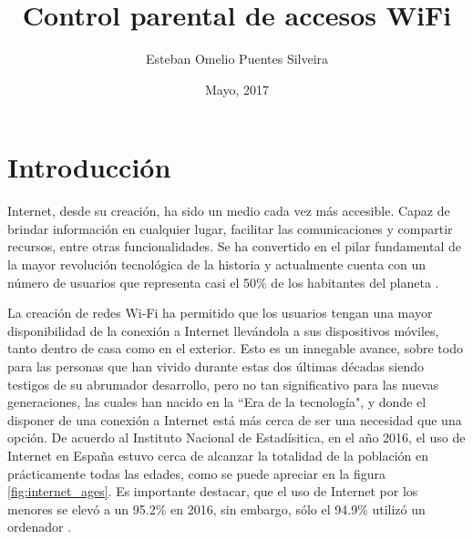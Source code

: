 \documentclass[12pt, twoside]{article}
\title{Control parental de accesos WiFi}
\author{Esteban Omelio Puentes Silveira}
\date{Mayo, 2017}
\begin{document}

\renewcommand\contentsname{Índice}
\renewcommand\listfigurename{Índice de figuras}
\renewcommand\listtablename{Índice de tablas}

\setlength{\parskip}{1em}

\tableofcontents
\clearpage
\listoffigures
\clearpage
\listoftables
\clearpage

\cleardoublepage \section{Introducción}\label{sec:int}


Internet, desde su creación, ha sido un medio cada vez más accesible. Capaz de brindar información en cualquier lugar, facilitar las comunicaciones y compartir recursos, entre otras funcionalidades. Se ha convertido en el pilar fundamental de la mayor revolución tecnológica de la historia y actualmente cuenta con un número de usuarios que representa casi el 50\% de los habitantes del planeta \cite{InternetUsage}.

La creación de redes Wi-Fi ha permitido que los usuarios tengan una mayor disponibilidad de la conexión a Internet llevándola a sus dispositivos móviles, tanto dentro de casa como en el exterior. Esto es un innegable avance, sobre todo para las personas que han vivido durante estas dos últimas décadas siendo testigos de su abrumador desarrollo, pero no tan significativo para las nuevas generaciones, las cuales han nacido en la ``Era de la tecnología", y donde el disponer de una conexión a Internet está más cerca de ser una necesidad que una opción. De acuerdo al Instituto Nacional de Estadísitica, en el año 2016, el uso de Internet en España estuvo cerca de alcanzar la totalidad de la población en prácticamente todas las edades, como se puede apreciar en la figura \ref{fig:internet_ages}. Es importante destacar, que el uso de Internet por los menores se elevó a un 95.2\% en 2016, sin embargo, sólo el 94.9\% utilizó un ordenador \cite{EncuestaTIC}.
\end{document}
